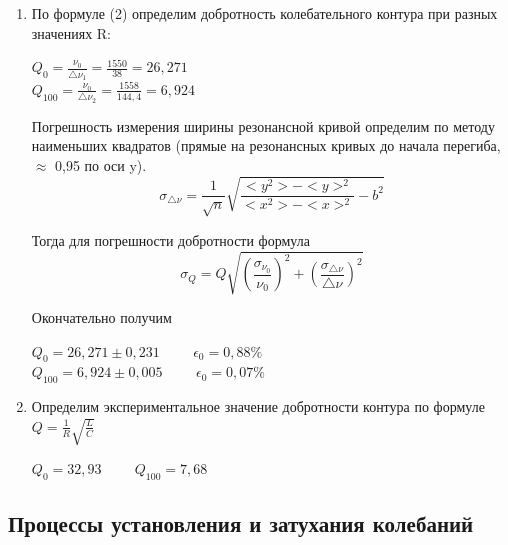 \documentclass[a4paper]{article}
\begin{document}
\begin{enumerate}
\item По формуле (2) определим добротность колебательного контура при разных значениях R:
\begin{center}
$Q_0 = \frac{\nu_0}{\triangle \nu_1} = \frac{1550}{38} = 26,271$ \\
$Q_{100} = \frac{\nu_0}{\triangle \nu_2} = \frac{1558}{144,4} = 6,924$
\end{center}

Погрешность измерения ширины резонансной кривой определим по методу наименьших квадратов (прямые на резонансных кривых до начала перегиба, $\approx$ 0,95 по оси y). 
$$\sigma_{\triangle \nu} = \frac{1}{\sqrt{n}} \sqrt{\frac{<y^2>-<y>^2}{<x^2>-<x>^2} - b^2}$$

Тогда для погрешности добротности формула
$$\sigma_Q = Q\sqrt{(\frac{\sigma_{\nu_0}}{\nu_0})^2 + (\frac{\sigma_{\triangle \nu}}{\triangle \nu})^2}$$

Окончательно получим

\begin{center}
$Q_0 =  26,271 \pm 0,231 \hspace{1cm} \epsilon_0 = 0,88\% $\\
$Q_{100} =  6,924 \pm 0,005 \hspace{1cm} \epsilon_0 = 0,07\% $

\end{center}

\item Определим экспериментальное значение добротности контура по формуле $Q = \frac{1}{R}\sqrt{\frac{L}{C}}$

\begin{center}
    $Q_0 = 32,93 \hspace{1cm} Q_{100} = 7,68$
\end{center}

\end{enumerate}

    
\subsection{Процессы установления и затухания колебаний}
\end{document}
